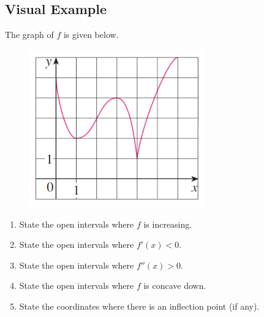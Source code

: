 \documentclass[10pt]{book}
\theoremstyle{definition}
\begin{document}
\subsection*{Visual Example} The graph of $f$ is given below.
\begin{figure}[h!]
    \centering
    \includegraphics[width=3in]{GraphA.png}
\end{figure}
\begin{enumerate}[label=(\alph*)]
    \item State the open intervals where $f$ is increasing.\vspace{1cm}
    \item State the open intervals where $f'(x)<0$.\vspace{1cm}
    \item State the open intervals where $f''(x)>0$.\vspace{1cm}
    \item State the open intervals where $f$ is concave down.\vspace{1cm}
    \item State the coordinates where there is an inflection point (if any).
\end{enumerate}
\clearpage
\end{document}
